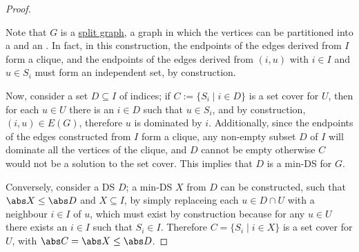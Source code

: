 \documentclass[a4paper, 12pt]{report}
\begin{document}
\begin{proof}
\begin{figure}[H]
        \end{figure}

        Note that $G$ is a \href{https://en.wikipedia.org/wiki/Split_graph}{split graph}, a graph in which the vertices can be partitioned into a  and an . In fact, in this construction, the endpoints of the edges derived from $I$ form a clique, and the endpoints of the edges derived from $(i, u)$ with $i \in I$ and $u \in S_i$ must form an independent set, by construction.

        Now, consider a set $D \subseteq I$ of indices; if $C := \{S_i \mid i \in D\}$ is a set cover for $U$, then for each $u \in U$ there is an $i \in D$ such that $u \in S_i$, and by construction, $(i, u) \in E(G)$, therefore $u$ is dominated by $i$. Additionally, since the endpoints of the edges constructed from $I$ form a clique, any non-empty subset $D$ of $I$ will dominate all the vertices of the clique, and $D$ cannot be empty otherwise $C$ would not be a solution to the set cover. This implies that $D$ is a min-DS for $G$.

        Conversely, consider a DS $D$; a min-DS $X$ from $D$ can be constructed, such that $\abs X \le \abs D$ and $X \subseteq I$, by simply replaceing each $u \in D \cap U$ with a neighbour $i \in I$ of $u$, which must exist by construction because for any $u \in U$ there exists an $i \in I$ such that $S_i \in I$. Therefore $C = \{S_i \mid i \in X\}$ is a set cover for $U$, with $\abs C = \abs X \le \abs D$.
    \end{proof}
\end{document}
